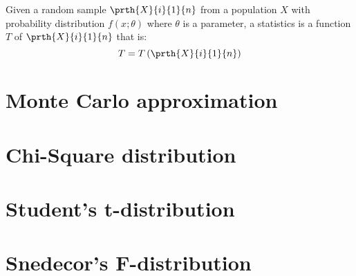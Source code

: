 Given a random sample $\prth{X}{i}{1}{n}$ from a population $X$ with 
probability distribution $f(x;\theta)$ where $\theta$ is a parameter, a 
statistics is a function $T$ of $\prth{X}{i}{1}{n}$ that is:
$$
T = T\left( \prth{X}{i}{1}{n} \right)
$$
\section{Monte Carlo approximation}

\section{Chi-Square distribution}

\section{Student's t-distribution}

\section{Snedecor's F-distribution}

